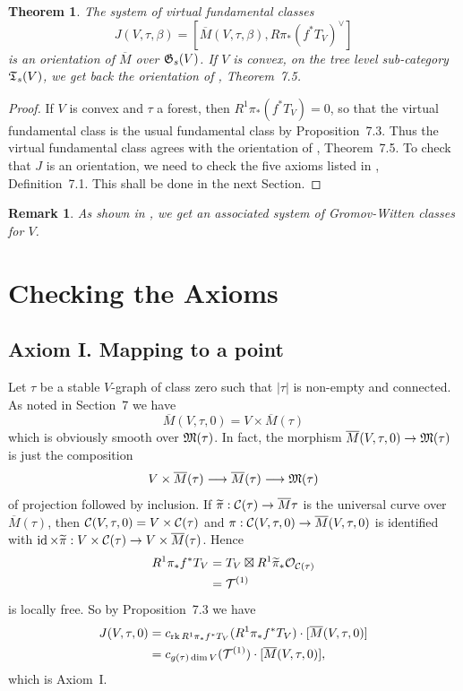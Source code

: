 \documentclass{article}
\newtheorem{them}[prop]{Theorem}
\newtheorem{rmkp}{Remark}\renewcommand{\thermkp}{}
\newenvironment{rmk}{\begin{rmkp}\rm}{\end{rmkp}}
\renewcommand{\tilde}{\widetilde}
\newcommand{\dual}[1]{{{#1}^{\vee}}}
\newcommand{\upst}{^{\ast}}
\newcommand{\lst}{_{\ast}}
\newcommand{\TT}{{\frak T}}
\newcommand{\GG}{{\frak G}}
\newcommand{\MM}{{\frak M}}
\newcommand{\tT}{{\cal T}}
\renewcommand{\O}{{\cal O}}
\newcommand{\cC}{{\cal C}}
\newcommand{\rk}{\mathop{\rm rk}}
\newcommand{\id}{\mathop{\rm id}}
\newcommand{\ol}{\overline}
\begin{document}
\begin{them} \label{ot} The system of virtual fundamental classes
\[J(V,\tau,\beta)=[\ol{M}(V,\tau,\beta),\dual{R\pi\lst(f\upst T_V)}]\] is an
orientation of $\ol{M}$ over $\GG_s(V)$. If $V$ is convex, on the tree level
sub-category
$\TT_s(V)$, we get back the orientation of \cite{BM}, Theorem~7.5.
\end{them}
\begin{proof} If $V$ is convex and $\tau$ a forest, then $R^1\pi\lst(f\upst
T_V)=0$, so that the virtual fundamental class is the usual
fundamental class by \cite{BF} Proposition~7.3. Thus the virtual
fundamental class agrees with the orientation of \cite{BM},
Theorem~7.5. To check that $J$ is an orientation, we need to check the
five axioms listed in
\cite{BM}, Definition~7.1. This shall be done in the next Section.
\end{proof}

\begin{rmk} As shown in \cite{BM}, we get an associated system of
Gromov-Witten
classes for $V$.
\end{rmk}

\section{Checking the Axioms} \label{check}

\subsection{{\sc Axiom I.} Mapping to a point}

Let $\tau$ be a stable $V$-graph of class zero such that $|\tau|$ is
non-empty and connected. As noted in \cite{BM} Section~7 we have
\[\ol{M}(V,\tau,0)=V\times\ol{M}(\tau)\]
which is obviously smooth over $\MM(\tau)$. In fact, the morphism
$\ol{M}(V,\tau,0)\to\MM(\tau)$ is just the composition
\[V\times\ol{M}(\tau)\longrightarrow\ol{M}(\tau)\longrightarrow\MM(\tau)\]
of projection followed by inclusion. If
$\tilde{\pi}:\cC(\tau)\to\ol{M}{\tau}$ is the universal curve over
$\ol{M}(\tau)$, then $\cC(V,\tau,0)=V\times\cC(\tau)$ and
$\pi:\cC(V,\tau,0)\to\ol{M}(V,\tau,0)$ is identified with
$\id\times\tilde{\pi}:V\times\cC(\tau)\to V\times\ol{M}(\tau)$. Hence
\begin{align*}
R^1\pi\lst f\upst T_V&=T_V\boxtimes R^1\tilde{\pi}\lst\O_{\cC(\tau)}\\
&=\tT^{(1)}
\end{align*}
is locally free. So by \cite{BF} Proposition~7.3 we have
\begin{align*}
J(V,\tau,0) & = c_{\rk R^1\pi\lst f\upst T_V}(R^1\pi\lst f\upst
T_V)\cdot[\ol{M}(V,\tau,0)]\\
& = c_{g(\tau)\dim V}(\tT^{(1)})\cdot[\ol{M}(V,\tau,0)],
\end{align*}
which is Axiom~I.
\end{document}
